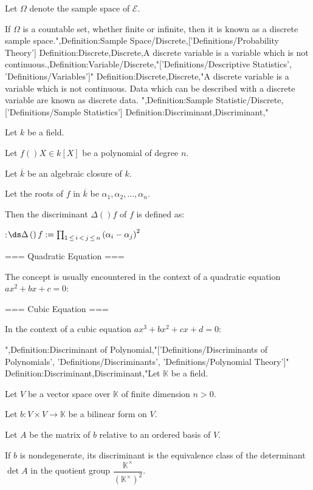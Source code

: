 Let $\Omega$ denote the sample space of $\mathcal E$.


If $\Omega$ is a countable set, whether finite or infinite, then it is known as a discrete sample space.",Definition:Sample Space/Discrete,['Definitions/Probability Theory']
Definition:Discrete,Discrete,A discrete variable is a variable which is not continuous.,Definition:Variable/Discrete,"['Definitions/Descriptive Statistics', 'Definitions/Variables']"
Definition:Discrete,Discrete,"A discrete variable is a variable which is not continuous.
Data which can be described with a discrete variable are known as discrete data.
",Definition:Sample Statistic/Discrete,['Definitions/Sample Statistics']
Definition:Discriminant,Discriminant,"


Let $k$ be a field.

Let $f \left(   \right)X \in k \left[ X \right]$ be a polynomial of degree $n$.

Let $\overline k$ be an algebraic closure of $k$.

Let the roots of $f$ in $\overline k$ be $\alpha_1, \alpha_2, \ldots, \alpha_n$.


Then the discriminant $\Delta \left(   \right)f$ of $f$ is defined as:

:$\ds \Delta \left(   \right)f := \prod_{1 \mathop \le i \mathop < j \mathop \le n} \left( \alpha_i - \alpha_j \right)^2$


=== Quadratic Equation ===

The concept is usually encountered in the context of a quadratic equation $a x^2 + b x + c = 0$:


=== Cubic Equation ===

In the context of a cubic equation $a x^3 + b x^2 + c x + d = 0$:

",Definition:Discriminant of Polynomial,"['Definitions/Discriminants of Polynomials', 'Definitions/Discriminants', 'Definitions/Polynomial Theory']"
Definition:Discriminant,Discriminant,"Let $\mathbb K$ be a field.

Let $V$ be a vector space over $\mathbb K$ of finite dimension $n>0$.

Let $b : V\times V \to \mathbb K$ be a bilinear form on $V$.

Let $A$ be the matrix of $b$ relative to an ordered basis of $V$.


If $b$ is nondegenerate, its discriminant is the equivalence class of the determinant $\det A$ in the quotient group $\dfrac {\mathbb K^\times} {\left( \mathbb K^\times \right)^2}$.

